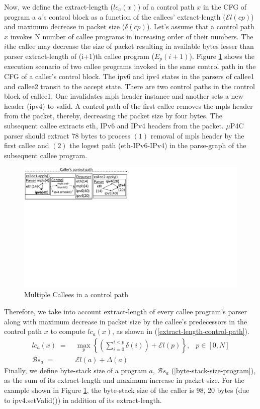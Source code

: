 Now, we define the extract-length ($lc_{a}(x)$) of a control path $x$ in the CFG of program a $a$'s control block as a function of the callees' extract-length ($\mathcal{E}l(cp)$) and maximum decrease in packet size ($\delta(cp)$).
Let's assume that a control path $x$ invokes N number of callee programs in increasing order of their numbers. 
The $i$the callee may decrease the size of packet resulting in available bytes lesser than parser extract-length of (i+1)th callee program ($E_{p}(i+1)$).
Figure \ref{fig:sequential-callees} shows the execution scenario of two callee programs invoked in the same control path in the CFG of a caller's control block.
The ipv6 and ipv4 states in the parsers of callee1 and callee2 transit to the accept state.
There are two control paths in the control block of callee1. One invalidates mpls header instance and another sets a new header (ipv4) to valid.
A control path of the first callee removes the mpls header from the packet, thereby, decreasing the packet size by four bytes.
The subsequent callee extracts eth, IPv6 and IPv4 headers from the packet.
$\mu$P4C parser should extract 78 bytes to process $(1)$ removal of mpls header by the first callee and $(2)$ the logest path (eth-IPv6-IPv4) in the parse-graph of the subsequent callee program.
\begin{figure}
    \centering
    \includegraphics[trim=0 396 487 0, clip,scale=0.5]{sequential-callees}
    \caption{Multiple Callees in a control path}
    \label{fig:sequential-callees}
\end{figure}
Therefore, we take into account extract-length of every callee program's parser along with maximum decrease in packet size by the callee's predecessors in the control path $x$ to compute $lc_{a}(x)$, as shown in (\ref{extract-length-control-path}).
\begin{align}
lc_{a}(x) \; =& \; \max_{p} \left\{ \left( \sum_{i=0}^{i<p} \delta(i) \right)+ \mathcal{E}l(p) \right\},&p \in [0,N] \label{extract-length-control-path} \\
\mathcal{B}s_{a} \; =& \; \mathcal{E}l(a) + \Delta(a) & \label{byte-stack-size-program}
\end{align}
Finally, we define byte-stack size of a program $a$, $\mathcal{B}s_{a}$ (\ref{byte-stack-size-program}), as the sum of its extract-length and maximum increase in packet size.
For the example shown in Figure \ref{fig:sequential-callees}, the byte-stack size of the caller is 98, 20 bytes (due to ipv4.setValid()) in addition of its extract-length.


